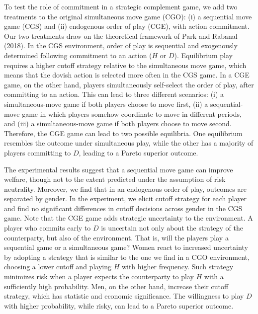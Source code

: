 \documentclass[12pt,english]{article}
\begin{document}
To test the role of commitment in a strategic complement game, we add two treatments to the original simultaneous move game (CGO): (i) a sequential move game (CGS) and (ii) endogenous order of play (CGE), with action commitment. Our two treatments draw on the theoretical framework of Park and Rabanal (2018). In the CGS environment, order of play is sequential and exogenously determined following commitment to an action ($H$ or $D$). Equilibrium play requires a higher cutoff strategy relative to the simultaneous move game, which means that the dovish action is selected more often in the CGS game. In a CGE game, on the other hand, players simultaneously self-select the order of play, after committing to an action. This can lead to three different scenarios: (i) a simultaneous-move game if both players choose to move first, (ii) a sequential-move game in which players somehow coordinate to move in different periods, and (iii) a simultaneous-move game if both players choose to move second. Therefore, the CGE game can lead to two possible equilibria. One equilibrium resembles the outcome under simultaneous play, while the other has a majority of players committing to $D$, leading to a Pareto superior outcome. 

The experimental results suggest that a sequential move game can improve welfare, though not to the extent predicted under the assumption of risk neutrality. Moreover, we find that in an endogenous order of play, outcomes are separated by gender. In the experiment, we elicit cutoff strategy for each player and find no significant differences in cutoff decisions across gender in the CGS game. Note that the CGE game adds strategic uncertainty to the environment. A player who commits early to $D$ is uncertain not only about the strategy of the counterparty, but also of the environment. That is, will the players play a sequential game or a simultaneous game? Women react to increased uncertainty by adopting a strategy that is similar to the one we find in a CGO environment, choosing a lower cutoff and playing $H$ with higher frequency. Such strategy minimizes risk when a player expects the counterparty to play $H$ with a sufficiently high probability. Men, on the other hand, increase their cutoff strategy, which has statistic and economic significance. The willingness to play $D$ with higher probability, while risky, can lead to a Pareto superior outcome. 
\end{document}
